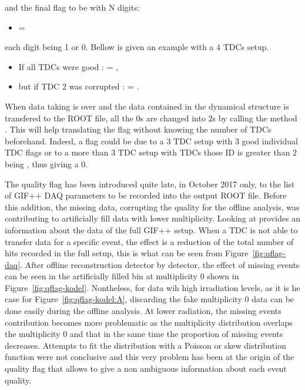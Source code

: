 and the final flag to be with N digits:
	
	\begin{itemize}
		\item[]  = 
	\end{itemize}
	
each digit being 1 or 0. Bellow is given an example with a 4 TDCs setup.
	
	\begin{itemize}
		\item[] If all TDCs were good :  = ,
		\item[] but if TDC 2 was corrupted :  = .
	\end{itemize}
                        
	When data taking is over and the data contained in the dynamical  structure is transfered to the ROOT file, all the 0s are changed into 2s by calling the method . This will help translating the flag without knowing the number of TDCs beforehand. Indeed, a flag  could be due to a 3 TDC setup with 3 good individual TDC flags or to a more than 3 TDC setup with TDCs those ID is greater than 2 being , thus giving a 0.
	
	The quality flag has been introduced quite late, in October 2017 only, to the list of GIF++ DAQ parameters to be recorded into the output ROOT file. Before this addition, the missing data, corrupting the quality for the offline analysis, was contributing to artificially fill data with lower multiplicity. Looking at  provides an information about the data of the full GIF++ setup. When a TDC is not able to transfer data for a specific event, the effect is a reduction of the total number of hits recorded in the full setup, this is what can be seen from Figure~\ref{fig:qflag-daq}. After offline reconstruction detector by detector, the effect of missing events can be seen in the artificially filled bin at multiplicity 0 shown in Figure~\ref{fig:qflag-kodel}. Nontheless, for data wih high irradiation levels, as it is he case for Figure~\ref{fig:qflag-kodel:A}, discarding the fake multiplicity 0 data can be done easily during the offline analysis. At lower radiation, the missing events contribution becomes more problematic as the multiplicity distribution overlaps the multiplicity 0 and that in the same time the proportion of missing events decreases. Attempts to fit the distribution with a Poisson or skew distribution function were not conclusive and this very problem has been at the origin of the quality flag that allows to give a non ambiguous information about each event quality.\\
	
